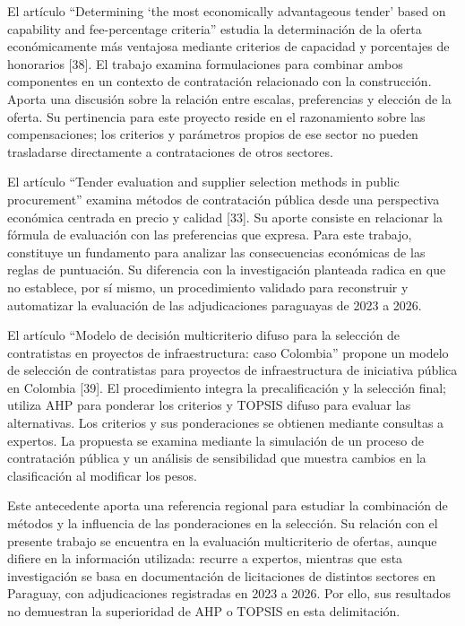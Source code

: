 \documentclass[12pt,a4paper]{article}
\begin{document}
El artículo ``Determining `the most economically advantageous tender' based on capability and fee-percentage criteria'' estudia la determinación de la oferta económicamente más ventajosa mediante criterios de capacidad y porcentajes de honorarios [38]. El trabajo examina formulaciones para combinar ambos componentes en un contexto de contratación relacionado con la construcción. Aporta una discusión sobre la relación entre escalas, preferencias y elección de la oferta. Su pertinencia para este proyecto reside en el razonamiento sobre las compensaciones; los criterios y parámetros propios de ese sector no pueden trasladarse directamente a contrataciones de otros sectores.

El artículo ``Tender evaluation and supplier selection methods in public procurement'' examina métodos de contratación pública desde una perspectiva económica centrada en precio y calidad [33]. Su aporte consiste en relacionar la fórmula de evaluación con las preferencias que expresa. Para este trabajo, constituye un fundamento para analizar las consecuencias económicas de las reglas de puntuación. Su diferencia con la investigación planteada radica en que no establece, por sí mismo, un procedimiento validado para reconstruir y automatizar la evaluación de las adjudicaciones paraguayas de 2023 a 2026.

El artículo ``Modelo de decisión multicriterio difuso para la selección de contratistas en proyectos de infraestructura: caso Colombia'' propone un modelo de selección de contratistas para proyectos de infraestructura de iniciativa pública en Colombia [39]. El procedimiento integra la precalificación y la selección final; utiliza AHP para ponderar los criterios y TOPSIS difuso para evaluar las alternativas. Los criterios y sus ponderaciones se obtienen mediante consultas a expertos. La propuesta se examina mediante la simulación de un proceso de contratación pública y un análisis de sensibilidad que muestra cambios en la clasificación al modificar los pesos.

Este antecedente aporta una referencia regional para estudiar la combinación de métodos y la influencia de las ponderaciones en la selección. Su relación con el presente trabajo se encuentra en la evaluación multicriterio de ofertas, aunque difiere en la información utilizada: recurre a expertos, mientras que esta investigación se basa en documentación de licitaciones de distintos sectores en Paraguay, con adjudicaciones registradas en 2023 a 2026. Por ello, sus resultados no demuestran la superioridad de AHP o TOPSIS en esta delimitación.
\end{document}
